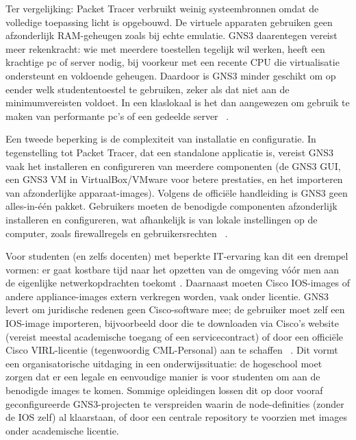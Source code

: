 Ter vergelijking: Packet Tracer verbruikt weinig systeembronnen omdat de volledige toepassing licht is opgebouwd. De virtuele apparaten gebruiken geen afzonderlijk RAM-geheugen zoals bij echte emulatie. GNS3 daarentegen vereist meer rekenkracht: wie met meerdere toestellen tegelijk wil werken, heeft een krachtige pc of server nodig, bij voorkeur met een recente CPU die virtualisatie ondersteunt en voldoende geheugen. Daardoor is GNS3 minder geschikt om op eender welk studententoestel te gebruiken, zeker als dat niet aan de minimumvereisten voldoet. In een klaslokaal is het dan aangewezen om gebruik te maken van performante pc’s of een gedeelde server ~\autocite{Kuzmenko2016}.

\vspace{0.3cm}

Een tweede beperking is de complexiteit van installatie en configuratie. In tegenstelling tot Packet Tracer, dat een standalone applicatie is, vereist GNS3 vaak het installeren en configureren van meerdere componenten (de GNS3 GUI, een GNS3 VM in VirtualBox/VMware voor betere prestaties, en het importeren van afzonderlijke apparaat-images). Volgens de officiële handleiding is GNS3 geen alles-in-één pakket. Gebruikers moeten de benodigde componenten afzonderlijk installeren en configureren, wat afhankelijk is van lokale instellingen op de computer, zoals firewallregels en gebruikersrechten ~\autocite{Golightly2023}.

\vspace{0.3cm}

Voor studenten (en zelfs docenten) met beperkte IT-ervaring kan dit een drempel vormen: er gaat kostbare tijd naar het opzetten van de omgeving vóór men aan de eigenlijke netwerkopdrachten toekomt \autocite{Amrizal2022}. Daarnaast moeten Cisco IOS-images of andere appliance-images extern verkregen worden, vaak onder licentie. GNS3 levert om juridische redenen geen Cisco-software mee; de gebruiker moet zelf een IOS-image importeren, bijvoorbeeld door die te downloaden via Cisco’s website (vereist meestal academische toegang of een servicecontract) of door een officiële Cisco VIRL-licentie (tegenwoordig CML-Personal) aan te schaffen ~\autocite{gns3_ios_images}. Dit vormt een organisatorische uitdaging in een onderwijssituatie: de hogeschool moet zorgen dat er een legale en eenvoudige manier is voor studenten om aan de benodigde images te komen. Sommige opleidingen lossen dit op door vooraf geconfigureerde GNS3-projecten te verspreiden waarin de node-definities (zonder de IOS zelf) al klaarstaan, of door een centrale repository te voorzien met images onder academische licentie.~\autocite{gns3_docs2025}

